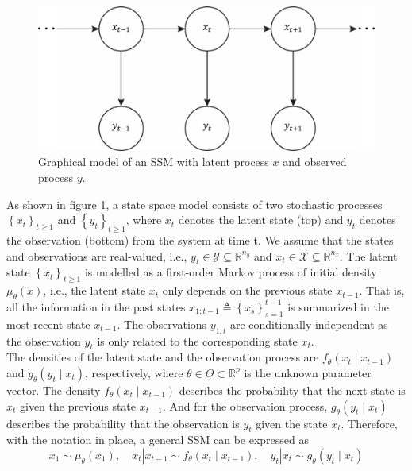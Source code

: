 \documentclass[mstat,12pt]{unswthesis}  %
\numberwithin{equation}{section}
\begin{document}
\begin{figure}[H]
    \centering
    \includegraphics[width=0.65\linewidth]{SSM.jpg}
    \caption{Graphical model of an SSM with latent process $x$ and observed process $y$.}
    \label{fig:SSM}
\end{figure}

\noindent As shown in figure \ref{fig:SSM}, a state space model consists of two stochastic processes $\left\{x_{t}\right\}_{t \geq 1}$ and $\left\{y_{t}\right\}_{t \geq 1}$, where $x_{t}$ denotes the latent state (top) and $y_{t}$ denotes the observation (bottom) from the system at time t. We assume that the states and observations are real-valued, i.e., $y_{t} \in \mathcal{Y} \subseteq \mathbb{R}^{n_{y}}$ and $x_{t} \in \mathcal{X} \subseteq\mathbb{R}^{n_{x}}$. The latent state $\left\{x_{t}\right\}_{t \geq 1}$ is modelled as a first-order Markov process of initial density $\mu_{\theta}(x)$, i.e., the latent state $x_{t}$ only depends on the previous state $x_{t-1}$. That is, all the information in the past states $x_{1: t-1} \triangleq\left\{x_{s}\right\}_{s=1}^{t-1}$ is summarized in the most recent state $x_{t-1}$. The observations $y_{1:t}$ are conditionally independent as the observation $y_{t}$ is only related to the corresponding state  $x_{t}$.\\

\noindent The densities of the latent state and the observation process are 
$f_{\theta}\left(x_{t} \mid x_{t-1}\right)$ and $g_{\theta}\left(y_{t} \mid x_{t}\right)$, respectively, where $\theta \in \Theta \subset \mathbb{R}^{p}$ is the unknown parameter vector.
The density $f_{\theta}\left(x_{t} \mid x_{t-1}\right)$ describes the probability that the next state is $x_{t}$ given the previous state $x_{t-1}$. And for the observation process, $g_{\theta}\left(y_{t} \mid x_{t}\right)$ describes the 
probability that the observation is $y_{t}$ given the state $x_{t}$. Therefore, with the notation in place, a
general SSM can be expressed as
\begin{equation}\label{density}
x_{1} \sim \mu_{\theta}\left(x_{1}\right), \quad x_{t}\left|x_{t-1} \sim f_{\theta}\left(x_{t} \mid x_{t-1}\right), \quad y_{t}\right| x_{t} \sim g_{\theta}\left(y_{t} \mid x_{t}\right)\end{equation}\\
\end{document}
